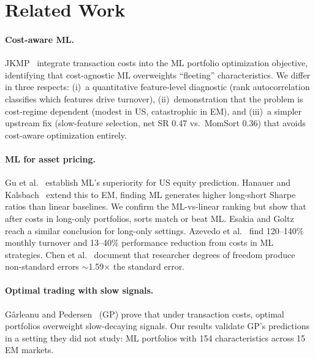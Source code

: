 \documentclass[sigconf,review,anonymous,balance=false]{acmart}
\begin{document}
\section{Related Work}

\paragraph{Cost-aware ML.}
JKMP~\cite{jensen2024implementable} integrate transaction costs into
the ML portfolio optimization objective, identifying that cost-agnostic
ML overweights ``fleeting'' characteristics. We differ in three respects:
(i)~a quantitative feature-level diagnostic (rank autocorrelation
classifies which features drive turnover), (ii)~demonstration that the
problem is cost-regime dependent (modest in US, catastrophic in EM),
and (iii)~a simpler upstream fix (slow-feature selection, net SR 0.47
vs.\ MomSort 0.36) that avoids cost-aware optimization entirely.

\paragraph{ML for asset pricing.}
Gu et al.~\cite{gu2020empirical} establish ML's superiority for US
equity prediction. Hanauer and Kalsbach~\cite{hanauer2023machine}
extend this to EM, finding ML generates higher long-short Sharpe ratios
than linear baselines. We confirm the ML-vs-linear ranking but show
that after costs in long-only portfolios, sorts match or beat ML.
Esakia and Goltz~\cite{esakia2025longonly} reach a similar conclusion
for long-only settings. Azevedo et al.~\cite{azevedo2024expected} find
120--140\% monthly turnover and 13--40\% performance reduction from
costs in ML strategies. Chen et al.~\cite{chen2025nonstandard} document
that researcher degrees of freedom produce non-standard errors
$\sim$1.59$\times$ the standard error.

\paragraph{Optimal trading with slow signals.}
G\^{a}rleanu and Pedersen~\cite{garleanu2013dynamic} (GP) prove that
under transaction costs, optimal portfolios overweight slow-decaying
signals. Our results validate GP's predictions in a setting they did
not study: ML portfolios with 154 characteristics across 15 EM
markets.
\end{document}
